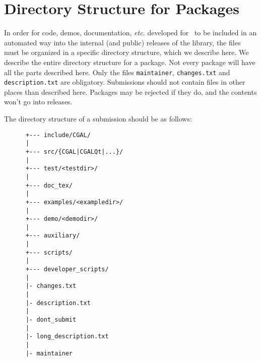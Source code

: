 
\chapter{Directory Structure for Packages}
\label{chap:directory_structure}

In order for code, demos, documentation, {\em etc.} developed for \cgal\ to 
be included in an automated way into the internal (and public) releases of the 
library, the files must be organized in a specific directory structure, which 
we describe here.  We describe the entire directory structure for a package. 
Not every package will have all the parts described here. Only the files
{\tt maintainer}, {\tt changes.txt} and {\tt description.txt} 
are obligatory.
Submissions should not contain files in other places than described here.
Packages may be rejected if they do, and the contents won't go into releases.

The directory structure of a submission should be as follows: 

\begin{verbatim}
      +--- include/CGAL/
      |
      +--- src/{CGAL|CGALQt|...}/
      |
      +--- test/<testdir>/
      |
      +--- doc_tex/
      |
      +--- examples/<exampledir>/
      |
      +--- demo/<demodir>/
      |
      +--- auxiliary/
      |
      +--- scripts/
      |
      +--- developer_scripts/
      |
      |- changes.txt
      |
      |- description.txt
      |
      |- dont_submit
      |
      |- long_description.txt
      |
      |- maintainer
\end{verbatim}


